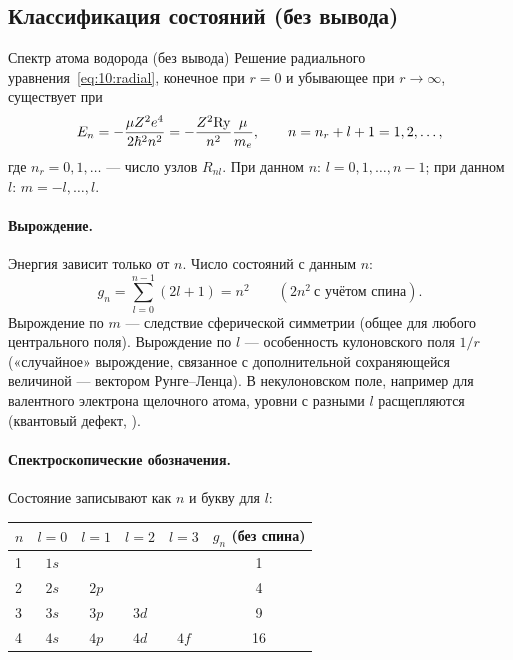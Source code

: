 \subsection{Классификация состояний (без вывода)}

\begin{principle}{Спектр атома водорода (без вывода)}
Решение радиального уравнения~\eqref{eq:10:radial}, конечное при $r=0$ и убывающее при $r\to\infty$,
существует при
\begin{equation}\label{eq:10:En}
  E_n=-\frac{\mu Z^2e^4}{2\hbar^2n^2}=-\frac{Z^2\mathrm{Ry}}{n^2}\frac{\mu}{m_e},\qquad n=n_r+l+1=1,2,\dots,
\end{equation}
где $n_r=0,1,\dots$ — число узлов $R_{nl}$. При данном $n$: $l=0,1,\dots,n-1$; при данном $l$: $m=-l,\dots,l$.
\end{principle}

\paragraph{Вырождение.} Энергия зависит только от $n$. Число состояний с данным $n$:
\begin{equation}\label{eq:10:deg}
  g_n=\sum_{l=0}^{n-1}(2l+1)=n^2\qquad(2n^2\ \text{с учётом спина}).
\end{equation}
Вырождение по $m$ — следствие сферической симметрии (общее для любого центрального поля).
Вырождение по $l$ — особенность кулоновского поля $1/r$ («случайное» вырождение, связанное с
дополнительной сохраняющейся величиной — вектором Рунге--Ленца). В некулоновском поле, например
для валентного электрона щелочного атома, уровни с разными $l$ расщепляются (квантовый дефект,
).

\paragraph{Спектроскопические обозначения.} Состояние записывают как $n$ и букву для $l$:
\begin{center}
\begin{tabular}{@{}lccccc@{}}
\toprule
$n$ & $l=0$ & $l=1$ & $l=2$ & $l=3$ & $g_n$ (без спина)\\
\midrule
1 & $1s$ & & & & 1\\
2 & $2s$ & $2p$ & & & 4\\
3 & $3s$ & $3p$ & $3d$ & & 9\\
4 & $4s$ & $4p$ & $4d$ & $4f$ & 16\\
\bottomrule
\end{tabular}
\end{center}

